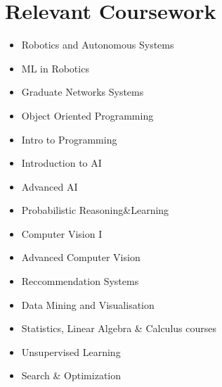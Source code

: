 \documentclass[letterpaper,11pt]{article}
\newcommand{\resumeSubHeadingListStart}{\begin{itemize}[leftmargin=0.0in, label={}]}
\newcommand{\resumeSubHeadingListEnd}{\end{itemize}}
\begin{document}
\section{Relevant Coursework}
        \begin{multicols}{2}
            \begin{itemize}[itemsep=-5pt, parsep=3pt]
                \item Robotics and Autonomous Systems
                \item ML in Robotics
                \item Graduate Networks Systems
                \item Object Oriented Programming
                \item Intro to Programming
                \item Introduction to AI
                \item Advanced AI
                \item Probabilistic Reasoning\&Learning
                \item Computer Vision I
                \item Advanced Computer Vision
                \item Reccommendation Systems
                \item Data Mining and Visualisation
                \item Statistics, Linear Algebra \& Calculus courses
                \item Unsupervised Learning
                \item Search \& Optimization
            \end{itemize}
        \end{multicols}
        \vspace*{2.0\multicolsep}

    
\end{document}

